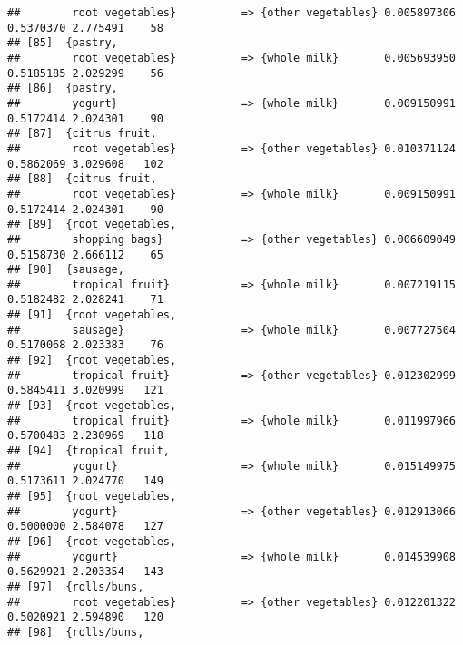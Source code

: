 \documentclass[]{article}
\begin{document}
\begin{verbatim}
##        root vegetables}          => {other vegetables} 0.005897306  0.5370370 2.775491    58
## [85]  {pastry,                                                                              
##        root vegetables}          => {whole milk}       0.005693950  0.5185185 2.029299    56
## [86]  {pastry,                                                                              
##        yogurt}                   => {whole milk}       0.009150991  0.5172414 2.024301    90
## [87]  {citrus fruit,                                                                        
##        root vegetables}          => {other vegetables} 0.010371124  0.5862069 3.029608   102
## [88]  {citrus fruit,                                                                        
##        root vegetables}          => {whole milk}       0.009150991  0.5172414 2.024301    90
## [89]  {root vegetables,                                                                     
##        shopping bags}            => {other vegetables} 0.006609049  0.5158730 2.666112    65
## [90]  {sausage,                                                                             
##        tropical fruit}           => {whole milk}       0.007219115  0.5182482 2.028241    71
## [91]  {root vegetables,                                                                     
##        sausage}                  => {whole milk}       0.007727504  0.5170068 2.023383    76
## [92]  {root vegetables,                                                                     
##        tropical fruit}           => {other vegetables} 0.012302999  0.5845411 3.020999   121
## [93]  {root vegetables,                                                                     
##        tropical fruit}           => {whole milk}       0.011997966  0.5700483 2.230969   118
## [94]  {tropical fruit,                                                                      
##        yogurt}                   => {whole milk}       0.015149975  0.5173611 2.024770   149
## [95]  {root vegetables,                                                                     
##        yogurt}                   => {other vegetables} 0.012913066  0.5000000 2.584078   127
## [96]  {root vegetables,                                                                     
##        yogurt}                   => {whole milk}       0.014539908  0.5629921 2.203354   143
## [97]  {rolls/buns,                                                                          
##        root vegetables}          => {other vegetables} 0.012201322  0.5020921 2.594890   120
## [98]  {rolls/buns,                                                                          

\end{verbatim}
\end{document}
